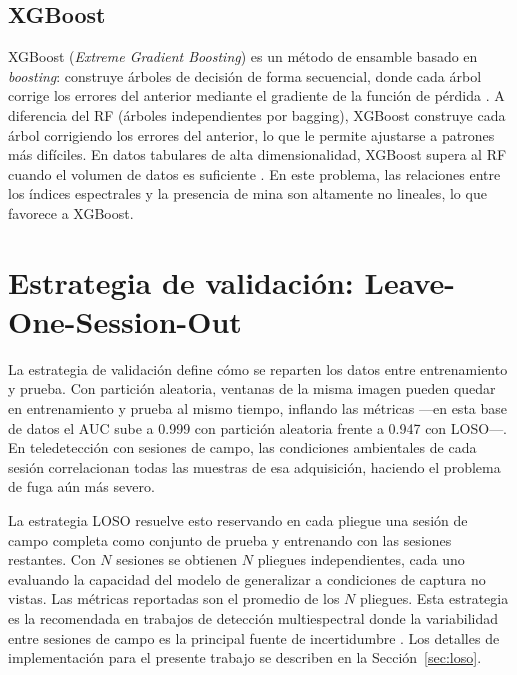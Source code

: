 \subsection{XGBoost}

XGBoost (\textit{Extreme Gradient Boosting}) es un método de ensamble
basado en \textit{boosting}: construye árboles de decisión de forma
secuencial, donde cada árbol corrige los errores del anterior mediante
el gradiente de la función de pérdida \cite{chen2016}. A diferencia del \ac{RF} (árboles independientes por bagging), XGBoost
construye cada árbol corrigiendo los errores del anterior, lo que le
permite ajustarse a patrones más difíciles. En datos tabulares de alta
dimensionalidad, XGBoost supera al \ac{RF} cuando el volumen de datos es
suficiente \cite{qiu2023}. En este problema, las relaciones entre los índices
espectrales y la presencia de mina son altamente no lineales, lo que favorece a
XGBoost.

\section{Estrategia de validación: Leave-One-Session-Out}
\label{sec:loso_teoria}

La estrategia de validación define cómo se reparten los datos entre
entrenamiento y prueba. Con partición aleatoria, ventanas de la misma imagen
pueden quedar en entrenamiento y prueba al mismo tiempo, inflando las
métricas ---en esta base de datos el AUC sube a 0.999 con partición
aleatoria frente a 0.947 con \ac{LOSO}---. En teledetección con sesiones
de campo, las condiciones ambientales de cada sesión correlacionan todas
las muestras de esa adquisición, haciendo el problema de fuga aún más
severo.

La estrategia \ac{LOSO} resuelve esto reservando en cada pliegue una sesión
de campo completa como conjunto de prueba y entrenando con las sesiones
restantes. Con $N$ sesiones se obtienen $N$ pliegues independientes, cada
uno evaluando la capacidad del modelo de generalizar a condiciones de
captura no vistas. Las métricas reportadas son el promedio de los $N$
pliegues. Esta estrategia es la recomendada en trabajos de detección
multiespectral donde la variabilidad entre sesiones de campo es la principal
fuente de incertidumbre \cite{silva2019}. Los detalles de implementación
para el presente trabajo se describen en la Sección~\ref{sec:loso}.